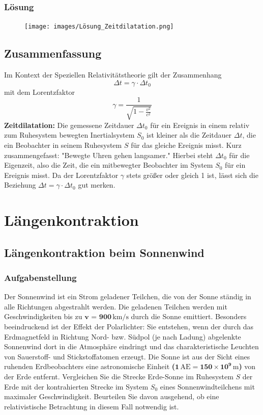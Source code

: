 \documentclass[a4paper]{report}
\begin{document}
\subsection{Lösung}
\begin{figure}[h]
	\centering
	\texttt{[image: images/Lösung\_Zeitdilatation.png]}
	\end{figure}
\section{Zusammenfassung}
\begin{tcolorbox}
	Im Kontext der Speziellen Relativitätstheorie gilt der Zusammenhang
\[ \Delta t = \gamma \cdot \Delta t_0 \]
mit dem Lorentzfaktor 
\[ \gamma = \frac{1}{\sqrt{1 - \frac{v^2}{c^2}}} \]
\textbf{Zeitdilatation:}
\newline
Die gemessene Zeitdauer \( \Delta t_0 \) für ein Ereignis in einem relativ zum Ruhesystem bewegten Inertialsystem \( S_0 \) ist kleiner als die Zeitdauer \( \Delta t \), die ein Beobachter in seinem Ruhesystem \( S \) für das gleiche Ereignis misst.
Kurz zusammengefasst: "Bewegte Uhren gehen langsamer."
Hierbei steht \( \Delta t_0 \) für die Eigenzeit, also die Zeit, die ein mitbewegter Beobachter im System \( S_0 \) für ein Ereignis misst. Da der Lorentzfaktor \( \gamma \) stets größer oder gleich 1 ist, lässt sich die Beziehung \( \Delta t = \gamma \cdot \Delta t_0 \) gut merken.
\end{tcolorbox}
\chapter{Längenkontraktion}
\section{Längenkontraktion beim Sonnenwind}
\subsection{Aufgabenstellung}
Der Sonnenwind ist ein Strom geladener Teilchen, die von der Sonne ständig in alle Richtungen abgestrahlt werden.
Die geladenen Teilchen werden mit Geschwindigkeiten bis zu \textbf{\(\textbf{v = }\mathbf{900} \, \text{km/s}\)} durch die Sonne emittiert. Besonders beeindruckend ist der Effekt der Polarlichter: Sie entstehen, wenn der durch das Erdmagnetfeld in Richtung Nord- bzw. Südpol (je nach Ladung) abgelenkte Sonnenwind dort in die Atmosphäre eindringt und das charakteristische Leuchten von Sauerstoff- und Stickstoffatomen erzeugt.
Die Sonne ist aus der Sicht eines ruhenden Erdbeobachters eine astronomische Einheit \textbf{(\(\mathbf{1} \, \text{AE} = \mathbf{150 \times 10^9} \, \text{m}\))} von der Erde entfernt. 
\newline
\newline
Vergleichen Sie die Strecke Erde-Sonne im Ruhesystem \(S\) der Erde mit der kontrahierten Strecke im System \(S_0\) eines Sonnenwindteilchens mit maximaler Geschwindigkeit. Beurteilen Sie davon ausgehend, ob eine relativistische Betrachtung in diesem Fall notwendig ist.
\pagebreak
\end{document}
